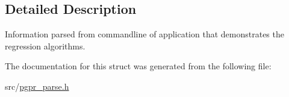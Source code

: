 \subsection{Detailed Description}
Information parsed from commandline of application that demonstrates the regression algorithms. 

The documentation for this struct was generated from the following file\+:\begin{DoxyCompactItemize}
\item 
src/\hyperlink{pgpr__parse_8h}{pgpr\+\_\+parse.\+h}\end{DoxyCompactItemize}
